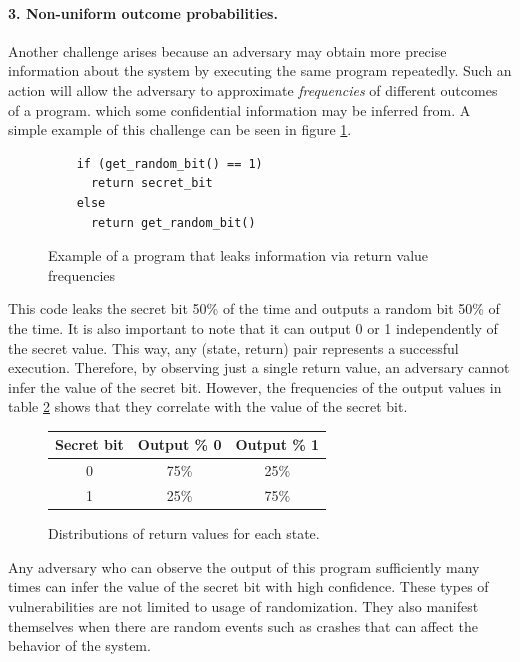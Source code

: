 \paragraph{3. Non-uniform outcome probabilities.}
Another challenge arises because an adversary may obtain
more precise information about the system by executing the same program repeatedly.
Such an action will allow the adversary to approximate \emph{frequencies} of
different outcomes of a program. which some confidential information may be inferred from. A simple example of this challenge can be seen in figure \ref{fig:Frequency_Leaking_Program}.

\begin{figure}[H]
\centering
    \begin{verbatim}
    if (get_random_bit() == 1)
      return secret_bit
    else
      return get_random_bit()
    \end{verbatim}
\caption{Example of a program that leaks information via return value frequencies}
\label{fig:Frequency_Leaking_Program}
\end{figure}

This code leaks the secret bit 50\% of the time and outputs a random bit 50\% of the time. It is also important to note that it can output 0 or 1 independently of the secret value. This way, any (state, return) pair represents a successful execution. Therefore, by observing just a single return value, an adversary cannot infer the value of the secret bit. However, the frequencies of the output values in table \ref{table:Return_value_distribution} shows that they correlate with the value of the secret bit.

\begin{figure}[H]
    \centering
\begin{tabular}{| c | c | c |}
	\hline
	Secret bit & Output \% 0 & Output \% 1 \\
	\hline
	0 &	75\% & 25\% \\
	\hline
	1 &	25\% & 75\% \\
	\hline
\end{tabular}
\caption{Distributions of return values for each state.}
\label{table:Return_value_distribution}
\end{figure}

Any adversary who can observe the output of this program sufficiently many times can infer the value of the secret bit with high confidence. These types of vulnerabilities are not limited to usage of randomization. They also manifest themselves when there are random events such as crashes that can affect the behavior of the system.


